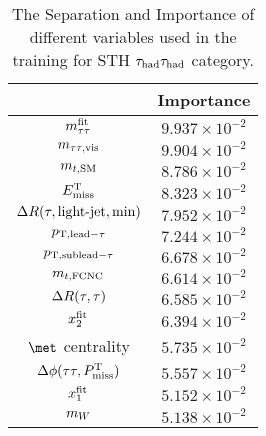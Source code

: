 \begin{table}
\caption{The Separation and Importance of different variables used in the training for STH $\tau_\text{had}{}\tau_\text{had}$ category.}
\centering
\begin{tabular}{|c|c|} \hline
 & Importance \\ \hline
$m_{\tau\tau}^{\text{fit}}    $  & $9.937\times10^{-2}$  \\ \hline
$m_{\tau\tau,\text{vis}}     $  & $9.904\times10^{-2}$  \\ \hline
$m_{t,\text{SM}}        $  & $8.786\times10^{-2}$  \\ \hline
$E^{\text{T}}_{\text{miss}}        $  & $8.323\times10^{-2}$  \\ \hline
$\Delta R(\tau,\text{light-jet},\text{min})     $  & $7.952\times10^{-2}$  \\ \hline
$p_{\text{T},\text{lead}-\tau}        $  & $7.244\times10^{-2}$  \\ \hline
$p_{\text{T},\text{sublead}-\tau}        $  & $6.678\times10^{-2}$  \\ \hline
$m_{t,\text{FCNC}}        $  & $6.614\times10^{-2}$  \\ \hline
$\Delta R(\tau,\tau)      $  & $6.585\times10^{-2}$  \\ \hline
$x_2^{\text{fit}}         $  & $6.394\times10^{-2}$  \\ \hline
$\met$ centrality  & $5.735\times10^{-2}$  \\ \hline
$\Delta\phi(\tau\tau,P^{\text{T}}_{\text{miss}}) $  & $5.557\times10^{-2}$  \\ \hline
$x_1^{\text{fit}}         $  & $5.152\times10^{-2}$  \\ \hline
$m_W         $  & $5.138\times10^{-2}$  \\ \hline


\end{tabular}
\label{tab:mva_sep_imp_hh_3j}
\end{table}

